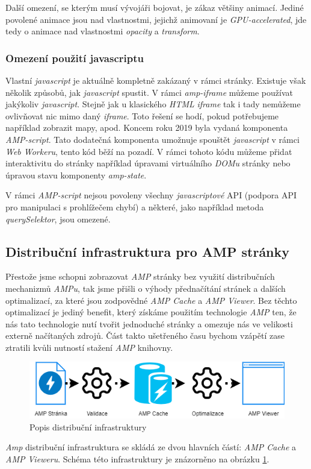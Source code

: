 Další omezení, se kterým musí vývojáři bojovat, je zákaz většiny animací. Jediné povolené animace jsou nad vlastnostmi, jejichž animovaní je \emph{GPU-accelerated}, jde tedy o animace nad vlastnostmi \emph{opacity} a \emph{transform}\cite{AMPCss}.

\subsubsection*{Omezení použití javascriptu}
Vlastní \emph{javascript} je aktuálně kompletně zakázaný v rámci stránky. Existuje však několik způsobů, jak \emph{javascript} spustit.
V rámci \emph{amp-iframe} můžeme používat jakýkoliv \emph{javascript}. Stejně jak u klasického \emph{HTML} \emph{iframe} tak i tady nemůžeme ovlivňovat nic mimo daný \emph{iframe}. Toto řešení se hodí, pokud potřebujeme například zobrazit mapy, apod.
Koncem roku 2019 byla vydaná komponenta \emph{AMP-script}. Tato dodatečná komponenta umožnuje spouštět \emph{javascript} v rámci \emph{Web Workeru}, tento kód běží na pozadí. V rámci tohoto kódu můžeme přidat interaktivitu do stránky například úpravami virtuálního \emph{DOMu} stránky nebo úpravou stavu komponenty \emph{amp-state}.

V rámci \emph{AMP-script} nejsou povoleny všechny \emph{javascriptové} API (podpora API pro manipulaci s prohlížečem chybí) a některé, jako například metoda \emph{querySelektor}, jsou omezené\cite{amp-script}.

\subsection*{Distribuční infrastruktura pro AMP stránky}

Přestože jsme schopni zobrazovat \emph{AMP} stránky bez využití distribučních mechanizmů \emph{AMPu}, tak jsme přišli o výhody přednačítání stránek a dalších optimalizací, za které jsou zodpovědné \emph{AMP Cache} a \emph{AMP Viewer}.
Bez těchto optimalizací je jediný benefit, který získáme použitím technologie \emph{AMP} ten, že nás tato technologie nutí tvořit jednoduché stránky a omezuje nás ve velikosti externě načítaných zdrojů. Část takto ušetřeného času bychom vzápětí zase ztratili kvůli nutností stažení \emph{AMP} knihovny.

\begin{figure}[hbt]
	\centering
	\includegraphics[width=1\textwidth]{obrazky-figures/AmpDistribuce.png}
	\caption{Popis distribuční infrastruktury}
	\label{Popis Distribuční infrastruktury AMP}
\end{figure}
\emph{Amp} distribuční infrastruktura se skládá ze dvou hlavních částí: \emph{AMP Cache} a \emph{AMP Vieweru}. Schéma této infrastruktury je znázorněno na obrázku \ref{Popis Distribuční infrastruktury AMP}.

